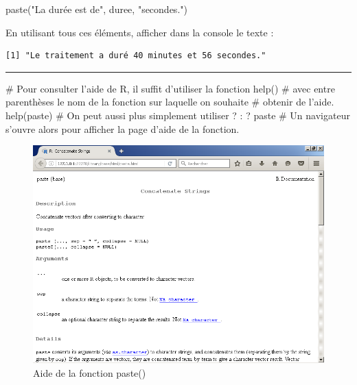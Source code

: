 \documentclass[12pt,twosided, notitlepage]{book}
\newenvironment{Shaded}{}{}
\newcommand{\CommentTok}[1]{\textcolor[rgb]{0.00,0.50,0.00}{#1}}
\newcommand{\KeywordTok}[1]{\textcolor[rgb]{0.00,0.00,1.00}{#1}}
\newcommand{\NormalTok}[1]{#1}
\newcommand{\StringTok}[1]{\textcolor[rgb]{0.00,0.50,0.50}{#1}}
\newif \ifsol
\renewenvironment{Shaded}{\begin{snugshade}}{\end{snugshade}}
\begin{document}
\begin{enumerate}
\begin{Shaded}
\begin{Highlighting}[]
\KeywordTok{paste}\NormalTok{(}\StringTok{"La durée est de"}\NormalTok{, duree, }\StringTok{"secondes."}\NormalTok{)}
\end{Highlighting}
\end{Shaded}

  En utilisant tous ces éléments, afficher dans la console le texte :

\begin{verbatim}
[1] "Le traitement a duré 40 minutes et 56 secondes."
\end{verbatim}

  \ifsol 

  \begin{center} \rule{0.5\linewidth}{\linethickness}\end{center}

\begin{Shaded}
\begin{Highlighting}[]
\CommentTok{# Pour consulter l'aide de R, il suffit d'utiliser la fonction help()}
\CommentTok{# avec entre parenthèses le nom de la fonction sur laquelle on souhaite}
\CommentTok{# obtenir de l'aide. }
\KeywordTok{help}\NormalTok{(paste)}
\CommentTok{# On peut aussi plus simplement utiliser ? :}
\NormalTok{? paste}
\CommentTok{# Un navigateur s'ouvre alors pour afficher la page d'aide de la fonction.}
\end{Highlighting}
\end{Shaded}

  \begin{figure}
  \centering
  \includegraphics{../figures/Aide_paste.png}
  \caption{Aide de la fonction paste()}
  \end{figure}


\end{enumerate}
\end{document}
